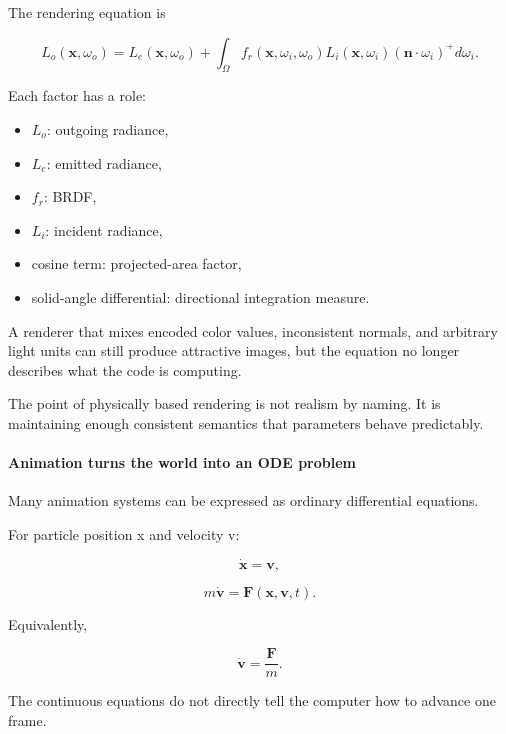 \hypertarget{03-visual-computing-i-ch001-the-rendering-equation-and-brdf-are-only-meaningful-under-consistent-units-and-spaces}{}

The rendering equation is

\[
L_o(\mathbf x,\omega_o)
=
L_e(\mathbf x,\omega_o)
+
\int_{\Omega}
f_r(\mathbf x,\omega_i,\omega_o)
L_i(\mathbf x,\omega_i)
(\mathbf n\cdot\omega_i)^+
d\omega_i.
\]

Each factor has a role:

\begin{itemize}
\tightlist
\item
  \(L_o\): outgoing radiance,
\item
  \(L_e\): emitted radiance,
\item
  \(f_r\): BRDF,
\item
  \(L_i\): incident radiance,
\item
  cosine term: projected-area factor,
\item
  solid-angle differential: directional integration measure.
\end{itemize}

A renderer that mixes encoded color values, inconsistent normals, and arbitrary light units can still produce attractive images, but the equation no longer describes what the code is computing.

The point of physically based rendering is not realism by naming. It is maintaining enough consistent semantics that parameters behave predictably.

\paragraph{Animation turns the world into an ODE problem}\label{03-visual-computing-i-ch001-animation-turns-the-world-into-an-ode-problem}

\hypertarget{03-visual-computing-i-ch001-animation-turns-the-world-into-an-ode-problem}{}

Many animation systems can be expressed as ordinary differential equations.

For particle position x and velocity v:

\[
\dot{\mathbf x}=\mathbf v,
\]

\[
m\dot{\mathbf v}=\mathbf F(\mathbf x,\mathbf v,t).
\]

Equivalently,

\[
\dot{\mathbf v}
=
\frac{\mathbf F}{m}.
\]

The continuous equations do not directly tell the computer how to advance one frame.

